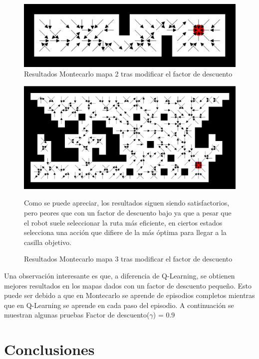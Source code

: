 \documentclass[conference,a4paper]{IEEEtran}
\begin{document}
\begin{figure}[h]
  \centering
  \includegraphics[scale=0.18]{report/Montecarlo0.9_2.png}
  \caption{Resultados Montecarlo mapa 2 tras modificar el factor de descuento}
  \label{fig:Montecarlo0.9_2}
\end{figure}

\begin{figure}[h]
  \includegraphics[scale=0.18]{report/Montecarlo0.9_3.png}
  \caption{Resultados Montecarlo mapa 3 tras modificar el factor de descuento}
  \label{fig:Montecarlo0.9_3}
  \vspace{0.5cm}
  Como se puede apreciar, los resultados siguen siendo satisfactorios, pero peores que con un factor de descuento bajo ya que a pesar que el robot suele seleccionar la ruta más eficiente, en ciertos estados selecciona una acción que difiere de la más óptima para llegar a la casilla objetivo.\newline
\end{figure}

Una observación interesante es que, a diferencia de Q-Learning, se obtienen mejores resultados en los mapas dados con un factor de descuento pequeño. Esto puede ser debido a que en Montecarlo se aprende de episodios completos mientras que en Q-Learning se aprende en cada paso del episodio. A continuación se muestran algunas pruebas Factor de descuento($\gamma$) = 0.9\newline

\section{Conclusiones}
\end{document}
